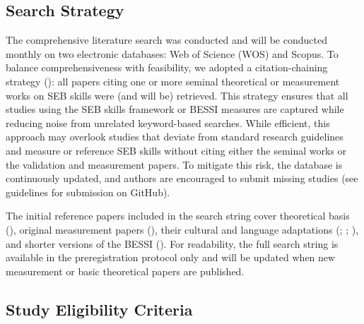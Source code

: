 \documentclass[
  man,
  longtable,
  nolmodern,
  notxfonts,
  notimes,
  colorlinks=true,linkcolor=blue,citecolor=blue,urlcolor=blue]{apa7}
\begin{document}
\subsection{Search Strategy}\label{search-strategy}

The comprehensive literature search was conducted and will be conducted
monthly on two electronic databases: Web of Science (WOS) and Scopus. To
balance comprehensiveness with feasibility, we adopted a
citation-chaining strategy
():
all papers citing one or more seminal theoretical or measurement works
on SEB skills were (and will be) retrieved. This strategy ensures that
all studies using the SEB skills framework or BESSI measures are
captured while reducing noise from unrelated keyword-based searches.
While efficient, this approach may overlook studies that deviate from
standard research guidelines and measure or reference SEB skills without
citing either the seminal works or the validation and measurement
papers. To mitigate this risk, the database is continuously updated, and
authors are encouraged to submit missing studies (see guidelines for
submission on GitHub).

The initial reference papers included in the search string cover
theoretical basis (), original measurement papers
(), their cultural and language adaptations
(; ; ), and shorter versions of the BESSI
(). For readability, the full search string is available in the
preregistration protocol only and will be updated when new measurement
or basic theoretical papers are published.

\subsection{Study Eligibility
Criteria}\label{study-eligibility-criteria}
\end{document}
